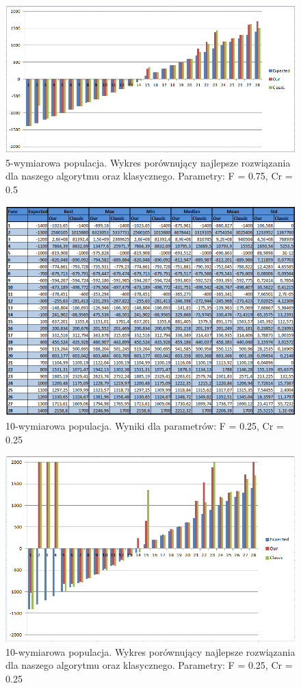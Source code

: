 \documentclass[a4paper]{article}
\begin{document}
\begin{figure}
\centering
\includegraphics[width=\textwidth]{F75Cr75L5chart.png}
\caption{5-wymiarowa populacja. Wykres porównujący najlepsze rozwiązania dla naszego algorytmu oraz klasycznego. Parametry: F = 0.75, Cr = 0.5}
\end{figure}

\begin{figure}
\centering
\includegraphics[width=\textwidth]{F25Cr25L10tab.png}
\caption{10-wymiarowa populacja. Wyniki dla parametrów: F = 0.25, Cr = 0.25}
\end{figure}

\begin{figure}
\centering
\includegraphics[width=\textwidth]{F25Cr25L10chart.png}
\caption{10-wymiarowa populacja. Wykres porównujący najlepsze rozwiązania dla naszego algorytmu oraz klasycznego. Parametry: F = 0.25, Cr = 0.25}
\end{figure}
\end{document}
